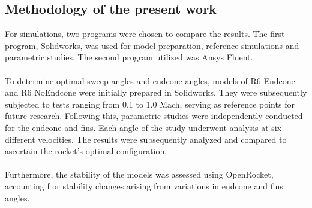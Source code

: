 \documentclass{article}
\begin{document}

\subsection{Methodology of the present work}
For simulations, two programs were chosen to compare the results. The first program, 
Solidworks, was used for model preparation, reference simulations and parametric studies. The second 
program utilized was Ansys Fluent.\\\\
To determine optimal sweep angles and endcone angles, models of R6 Endcone and R6 NoEndcone were 
initially prepared in Solidworks. They were subsequently subjected to tests ranging from 0.1 to 1.0 
Mach, serving as reference points for future research. Following this, parametric studies were 
independently conducted for the endcone and fins. Each angle of the study underwent analysis at 
six different velocities. The results were subsequently analyzed and compared to ascertain the 
rocket's optimal configuration.\\\\
Furthermore, the stability of the models was assessed using OpenRocket, accounting f
or stability changes arising from variations in endcone and fins angles.
\end{document}
